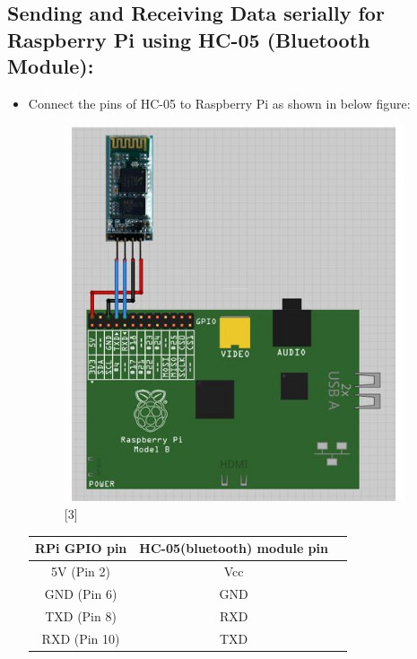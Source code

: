 \documentclass[11pt,a4paper]{article}
\begin{document}
	\subsection{Sending and Receiving Data serially for Raspberry Pi using HC-05 (Bluetooth Module):}
	\begin{itemize}
		\item Connect the pins of HC-05 to Raspberry Pi as shown in below figure:
		\begin{figure}[h!]
			\includegraphics[width=10cm]{HC-05_connection.JPG}
			\centering
			\caption{[3]}
		\end{figure}
		\newpage 
		\begin{tabular}{|c|c|c|}
			\hline
			RPi GPIO pin & HC-05(bluetooth) module pin \\
			\hline 
			5V (Pin 2) & Vcc\\
			\hline
			GND (Pin 6) & GND\\
			\hline 
			TXD (Pin 8) & RXD\\
			\hline 
			RXD (Pin 10) & TXD\\
			\hline			
		\end{tabular}
		\flushleft
	\end{itemize}
\end{document}
